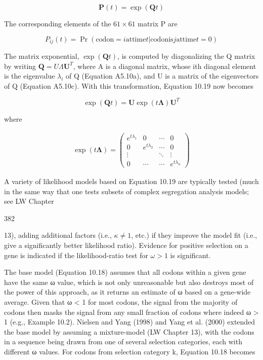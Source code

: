 \documentclass{article}
\begin{document}
\begin{equation}
\mathbf{P}(t)=\exp(\mathbf{Q}t)
\tag{10.19}
\label{eq:10_19}
\end{equation}

The corresponding elements of the  $ 61 \times 61 $ matrix P are

\begin{equation}
P_{ij}(t)=\Pr(\mathrm{codon}=i\mathrm{at}\mathrm{time}t|\mathrm{codon}\mathrm{is}j\mathrm{at}\mathrm{time}t=0)
\tag{10.20}
\label{eq:10_20}
\end{equation}

The matrix exponential,  $ \exp(\mathbf{Q}t) $, is computed by diagonalizing the Q matrix by writing  $ \mathbf{Q} = U\Lambda\mathbf{U}^{T} $, where A is a diagonal matrix, whose ith diagonal element is the eigenvalue  $ \lambda_{i} $ of Q (Equation A5.10a), and U is a matrix of the eigenvectors of Q (Equation A5.10c). With this transformation, Equation 10.19 now becomes

\begin{equation}
\exp(\mathbf{Q}t)=\mathbf{U}\exp(t\boldsymbol{\Lambda})\mathbf{U}^{T}
\end{equation}

where

\begin{equation}
\begin{align*}\exp(t\boldsymbol{\Lambda})=\begin{pmatrix}e^{t\lambda_1}&0&\cdots&0\\0&e^{t\lambda_2}&\cdots&0\\\vdots&&\ddots&\vdots\\0&\cdots&\cdots&e^{t\lambda_n}\end{pmatrix}\end{align*}
\tag{10.21}
\label{eq:10_21}
\end{equation}

A variety of likelihood models based on Equation 10.19 are typically tested (much in the same way that one tests subsets of complex segregation analysis models; see LW Chapter

382

13), adding additional factors (i.e.,  $ \kappa \neq 1 $, etc.) if they improve the model fit (i.e., give a significantly better likelihood ratio). Evidence for positive selection on a gene is indicated if the likelihood-ratio test for  $ \omega > 1 $ is significant.

The base model (Equation 10.18) assumes that all codons within a given gene have the same ω value, which is not only unreasonable but also destroys most of the power of this approach, as it returns an estimate of ω based on a gene-wide average. Given that ω < 1 for most codons, the signal from the majority of codons then masks the signal from any small fraction of codons where indeed ω > 1 (e.g., Example 10.2). Nielsen and Yang (1998) and Yang et al. (2000) extended the base model by assuming a mixture-model (LW Chapter 13), with the codons in a sequence being drawn from one of several selection categories, each with different ω values. For codons from selection category k, Equation 10.18 becomes
\end{document}

